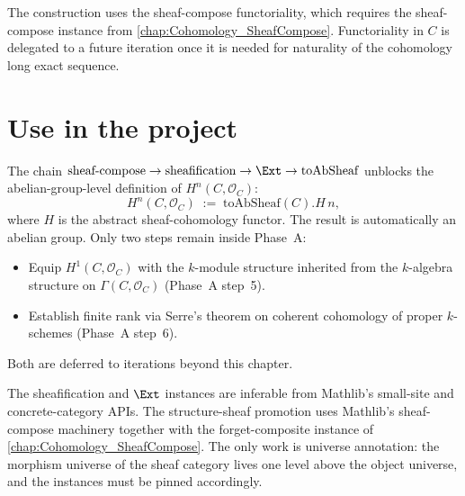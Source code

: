 The construction uses the sheaf-compose functoriality, which requires the sheaf-compose instance from \cref{chap:Cohomology_SheafCompose}. Functoriality in \(C\) is delegated to a future iteration once it is needed for naturality of the cohomology long exact sequence.

\section{Use in the project}

The chain \(\text{sheaf-compose} \to \text{sheafification} \to \Ext \to \text{toAbSheaf}\) unblocks the abelian-group-level definition of \(H^n(C, \mathcal O_C)\):
\[
  H^n(C, \mathcal O_C) \;:=\; \text{toAbSheaf}(C).H\,n,
\]
where \(H\) is the abstract sheaf-cohomology functor. The result is automatically an abelian group. Only two steps remain inside Phase~A:

\begin{itemize}
  \item Equip \(H^1(C, \mathcal O_C)\) with the \(k\)-module structure inherited from the \(k\)-algebra structure on \(\Gamma(C, \mathcal O_C)\) (Phase~A step~5).
  \item Establish finite rank via Serre's theorem on coherent cohomology of proper \(k\)-schemes (Phase~A step~6).
\end{itemize}

Both are deferred to iterations beyond this chapter.

\begin{remark}
  The sheafification and \(\Ext\) instances are inferable from Mathlib's small-site and concrete-category APIs. The structure-sheaf promotion uses Mathlib's sheaf-compose machinery together with the forget-composite instance of \cref{chap:Cohomology_SheafCompose}. The only work is universe annotation: the morphism universe of the sheaf category lives one level above the object universe, and the instances must be pinned accordingly.
\end{remark}
